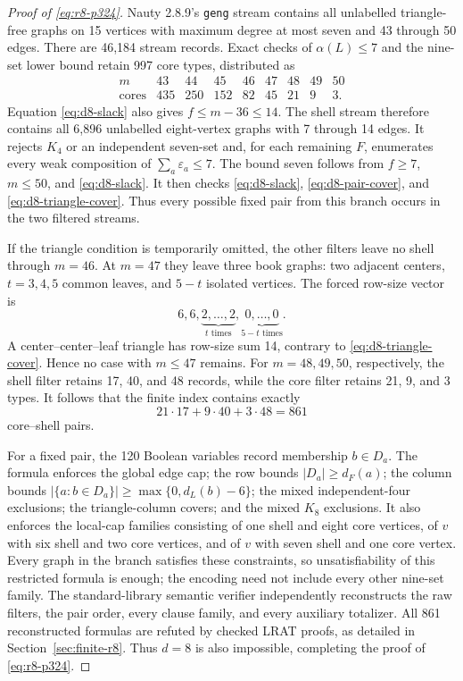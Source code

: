 \documentclass[11pt,reqno,a4paper]{amsart}
\theoremstyle{definition}
\theoremstyle{remark}
\begin{document}
\begin{proof}[Proof of \eqref{eq:r8-p324}]
Nauty 2.8.9's \texttt{geng} stream \cite{McKayPiperno2014} contains all
unlabelled triangle-free graphs
on 15 vertices with maximum degree at most seven and 43 through 50 edges.
There are 46,184 stream records. Exact checks of $\alpha(L)\leq7$ and
the nine-set lower bound retain 997 core types, distributed as
\[
\begin{array}{c|rrrrrrrr}
m&43&44&45&46&47&48&49&50\\ \hline
\text{cores}&435&250&152&82&45&21&9&3.
\end{array}
\]
Equation \eqref{eq:d8-slack} also gives $f\leq m-36\leq14$. The shell
stream therefore contains all 6,896 unlabelled eight-vertex graphs with
7 through 14 edges. It rejects $K_4$ or an independent seven-set and,
for each remaining $F$, enumerates every weak composition of
$\sum_a\varepsilon_a\leq7$. The bound seven follows from
$f\geq7$, $m\leq50$, and \eqref{eq:d8-slack}. It then checks
\eqref{eq:d8-slack}, \eqref{eq:d8-pair-cover}, and
\eqref{eq:d8-triangle-cover}. Thus every possible fixed pair from this
branch occurs in the two filtered streams.

If the triangle condition is temporarily omitted, the other filters leave
no shell through $m=46$. At $m=47$ they leave three book graphs: two
adjacent centers, $t=3,4,5$ common leaves, and $5-t$ isolated vertices.
The forced row-size vector is
\[
 6,6,\underbrace{2,\ldots,2}_{t\text{ times}},
 \underbrace{0,\ldots,0}_{5-t\text{ times}}.
\]
A center--center--leaf triangle has row-size sum 14, contrary to
\eqref{eq:d8-triangle-cover}. Hence no case with $m\leq47$ remains.
For $m=48,49,50$, respectively, the shell filter retains 17, 40, and
48 records, while the core filter retains 21, 9, and 3 types. It follows
that the finite index contains exactly
\[
 21\cdot17+9\cdot40+3\cdot48=861
\]
core--shell pairs.

For a fixed pair, the 120 Boolean variables record membership
$b\in D_a$. The formula enforces the global edge cap; the row bounds
$|D_a|\geq d_F(a)$; the column bounds
$|\{a:b\in D_a\}|\geq\max\{0,d_L(b)-6\}$; the mixed
independent-four exclusions; the triangle-column covers; and the mixed
$K_8$ exclusions. It also enforces the local-cap families consisting of
one shell and eight core vertices, of $v$ with six shell and two core
vertices, and of $v$ with seven shell and one core vertex. Every graph in
the branch satisfies these constraints, so unsatisfiability of this
restricted formula is enough; the encoding need not include every other
nine-set family.
The standard-library semantic verifier independently reconstructs the raw
filters, the pair order, every clause family, and every auxiliary
totalizer. All 861 reconstructed formulas are refuted by checked LRAT
proofs, as detailed in Section~\ref{sec:finite-r8}. Thus $d=8$ is also
impossible, completing the proof of \eqref{eq:r8-p324}.
\end{proof}
\end{document}

